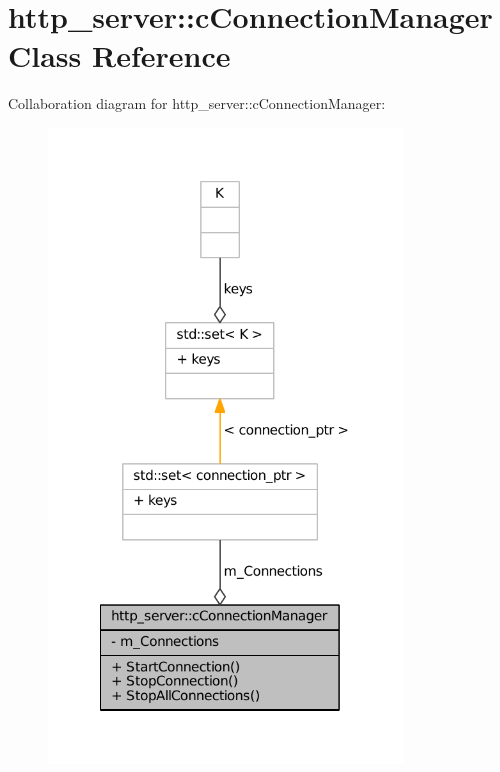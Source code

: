 \hypertarget{classhttp__server_1_1cConnectionManager}{\section{http\-\_\-server\-:\-:c\-Connection\-Manager \-Class \-Reference}
\label{classhttp__server_1_1cConnectionManager}
}


\-Collaboration diagram for http\-\_\-server\-:\-:c\-Connection\-Manager\-:\nopagebreak
\begin{figure}[H]
\begin{center}
\leavevmode
\includegraphics[width=266pt]{classhttp__server_1_1cConnectionManager__coll__graph}
\end{center}
\end{figure}
